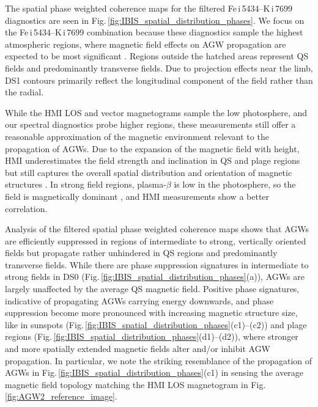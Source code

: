 \documentclass[preprint2,linenumbers]{aastex701}
\newcommand{\IBISFeUpperPhot}[1]{Fe\,{\sc i}\,5434}
\newcommand{\IBISK}[1]{K\,{\sc i}\,7699}
\begin{document}
The spatial phase weighted coherence maps for the filtered \IBISFeUpperPhot{}--\IBISK{} diagnostics are seen in Fig.\,\ref{fig:IBIS_spatial_distribution_phases}.
We focus on the \IBISFeUpperPhot{}--\IBISK{} combination because these diagnostics sample the highest atmospheric regions, where magnetic field effects on AGW propagation are expected to be most significant \citep{2019_Vigeesh_Roth_Steiner_Jackiewicz}.
Regions outside the hatched areas represent QS fields and predominantly transverse fields.
Due to projection effects near the limb, DS1 contours primarily reflect the longitudinal component of the field rather than the radial. 

While the HMI LOS and vector magnetograms sample the low photosphere, and our spectral diagnostics probe higher regions, these measurements still offer a reasonable approximation of the magnetic environment relevant to the propagation of AGWs.
Due to the expansion of the magnetic field with height, HMI underestimates the field strength and inclination in QS and plage regions but still captures the overall spatial distribution and orientation of magnetic structures \citep{2017_SainzDalda, 2025_Beck_Prasad_Hu_etal}.
In strong field regions, plasma-$\beta$ is low in the photosphere, so the field is magnetically dominant \citep{2021_Wiegelmann_Sakurai}, and HMI measurements show a better correlation.

Analysis of the filtered spatial phase weighted coherence maps shows that AGWs are efficiently suppressed in regions of intermediate to strong, vertically oriented fields but propagate rather unhindered in QS regions and predominantly transverse fields.
While there are phase suppression signatures in intermediate to strong fields in DS0 (Fig.\,\ref{fig:IBIS_spatial_distribution_phases}(a)), AGWs are largely unaffected by the average QS magnetic field.
Positive phase signatures, indicative of propagating AGWs carrying energy downwards, and phase suppression become more pronounced with increasing magnetic structure size, like in sunspots (Fig.\,\ref{fig:IBIS_spatial_distribution_phases}(c1)--(c2)) and plage regions (Fig.\,\ref{fig:IBIS_spatial_distribution_phases}(d1)--(d2)), where stronger and more spatially extended magnetic fields alter and/or inhibit AGW propagation.
In particular, we note the striking resemblance of the propagation of AGWs in Fig.\,\ref{fig:IBIS_spatial_distribution_phases}(c1) in sensing the average magnetic field topology matching the HMI LOS magnetogram in Fig.\,\ref{fig:AGW2_reference_image}.
\end{document}
